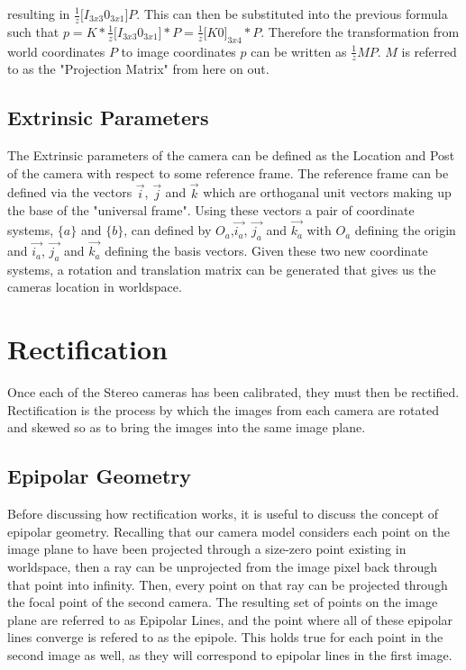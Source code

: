 resulting in $\frac{1}{z}\bigg[ I_{3x3} 0_{3x1} \bigg]P$.  This can then be substituted into the previous formula such that $p 
= K * \frac{1}{z}\bigg[I_{3x3}0_{3x1}\bigg] * P = \frac{1}{z}\bigg[K0\bigg]_{3x4}*P$.  Therefore the transformation from world 
coordinates $P$ to image coordinates $p$ can be written as $\frac{1}{z}MP$.  $M$ is referred to as the "Projection Matrix" from here 
on out.

\subsection{Extrinsic Parameters}
The Extrinsic parameters of the camera can be defined as the Location and Post of the camera with respect to some reference frame.  The reference frame can be defined via the vectors $\vec{i}$, $\vec{j}$ and $\vec{k}$ which are orthoganal unit vectors making up the base of the "universal frame".  Using these vectors a pair of coordinate systems, $\{a\}$ and $\{b\}$, can defined by $O_a$,$\vec{i_a}$, $\vec{j_a}$ and $\vec{k_a}$ with $O_a$ defining the origin and $\vec{i_a}$, $\vec{j_a}$ and $\vec{k_a}$ defining the basis vectors.  Given these two new coordinate systems, a rotation and translation matrix can be generated that gives us the cameras location in worldspace.

\section{Rectification}
Once each of the Stereo cameras has been calibrated, they must then be rectified.  Rectification is the process by which the images from each camera are rotated and skewed so as to bring the images into the same image plane.

\subsection{Epipolar Geometry}
Before discussing how rectification works, it is useful to discuss the concept of epipolar geometry.  Recalling that our camera model considers each point on the image plane to have been projected through a size-zero point existing in worldspace, then a ray can be unprojected from the image pixel back through that point into infinity.  Then, every point on that ray can be projected through the focal point of the second camera. The resulting set of points on the image plane are referred to as Epipolar Lines, and the point where all of these epipolar lines converge is refered to as the epipole.  This holds true for each point in the second image as well, as they will correspond to epipolar lines in the first image.

